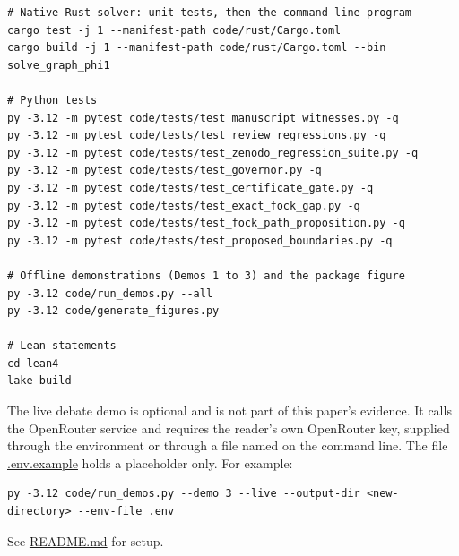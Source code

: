 \documentclass[
  11pt,
]{article}
\begin{document}
\begin{lstlisting}
# Native Rust solver: unit tests, then the command-line program
cargo test -j 1 --manifest-path code/rust/Cargo.toml
cargo build -j 1 --manifest-path code/rust/Cargo.toml --bin solve_graph_phi1

# Python tests
py -3.12 -m pytest code/tests/test_manuscript_witnesses.py -q
py -3.12 -m pytest code/tests/test_review_regressions.py -q
py -3.12 -m pytest code/tests/test_zenodo_regression_suite.py -q
py -3.12 -m pytest code/tests/test_governor.py -q
py -3.12 -m pytest code/tests/test_certificate_gate.py -q
py -3.12 -m pytest code/tests/test_exact_fock_gap.py -q
py -3.12 -m pytest code/tests/test_fock_path_proposition.py -q
py -3.12 -m pytest code/tests/test_proposed_boundaries.py -q

# Offline demonstrations (Demos 1 to 3) and the package figure
py -3.12 code/run_demos.py --all
py -3.12 code/generate_figures.py

# Lean statements
cd lean4
lake build
\end{lstlisting}

The live debate demo is optional and is not part of this paper's
evidence. It calls the OpenRouter service and requires the reader's own
OpenRouter key, supplied through the environment or through a file named
on the command line. The file
\href{https://github.com/dbccpage/the_symbol_game/blob/main/omega_engine_education/documentation/030_pfp_proposal_fidelity_protocol_pfp/papers/omega_engine_symbol_game/001_pfp_discrete_cochain_retraction_and_toy_involutions/.env.example}{.env.example}
holds a placeholder only. For example:

\begin{lstlisting}
py -3.12 code/run_demos.py --demo 3 --live --output-dir <new-directory> --env-file .env
\end{lstlisting}

See
\href{https://github.com/dbccpage/the_symbol_game/blob/main/omega_engine_education/documentation/030_pfp_proposal_fidelity_protocol_pfp/papers/omega_engine_symbol_game/001_pfp_discrete_cochain_retraction_and_toy_involutions/README.md}{README.md}
for setup.
\end{document}
